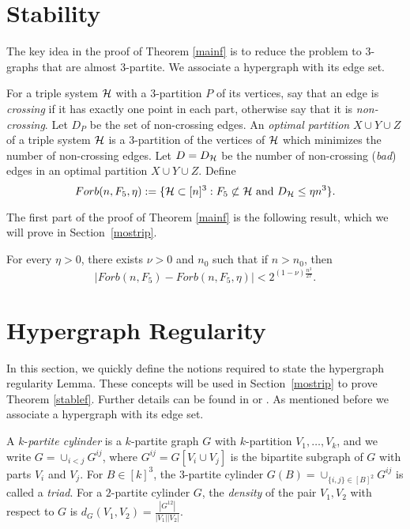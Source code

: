\documentclass[11pt]{article}
\begin{document}
\section{Stability}
The key idea in the proof of Theorem \ref{mainf} is to reduce the
problem to $3$-graphs that are almost $3$-partite. We  associate a hypergraph with its edge set.


 For a triple system $\mathcal{H}$
 with a $3$-partition $P$ of its vertices, say that an edge is {\em crossing} if it has exactly one point in each part,
 otherwise say that it is {\em non-crossing}.  Let $D_P$ be the set of non-crossing edges.
 An {\it
optimal partition} $X \cup Y \cup Z$ of a triple system $\mathcal{H}$ is a $3$-partition of the
vertices of $\mathcal{H}$ which minimizes the number of non-crossing edges.
Let $D=D_{\mathcal{H}}$ be the number of non-crossing ({\it bad}) edges in an
optimal partition $X \cup Y \cup Z$.  Define
$$Forb(n, F_5, \eta):=\{\mathcal{H} \subset [n]^3: F_5 \not\subset \mathcal{H}\hbox{ and } D_{\mathcal{H}}\le \eta n^3\}.$$

The first part of the proof of Theorem \ref{mainf} is the following
result, which we will prove in Section~\ref{mostrip}.

\begin{theorem} \label{stablef}
For every $\eta>0$, there exists $\nu>0$ and $n_0$ such that
 if $n>n_0$, then $$|Forb(n,F_5)-Forb(n, F_5, \eta)|<2^{(1-\nu)\frac{n^3}{27}}.$$
\end{theorem}


\section{Hypergraph Regularity}\label{hypreg}

In this section, we quickly define the notions required to state the
hypergraph regularity Lemma. These concepts will be used in
Section~\ref{mostrip} to prove Theorem \ref{stablef}. Further
details can be found in \cite{FR} or \cite{NR}.  As mentioned before
we associate a hypergraph with its edge set.

A $k$-{\it partite cylinder} is a $k$-partite graph $G$ with
$k$-partition $V_1, \ldots, V_k$, and we write $G=\cup_{i<j}
G^{ij}$, where $G^{ij}=G[V_i \cup V_j]$ is the bipartite subgraph
 of $G$ with parts $V_i$ and $V_j$.
 For $B \in [k]^3$, the $3$-partite cylinder $G(B)=\cup_{\{i,j\} \in [B]^2} G^{ij}$ is called a {\it triad}.
  For a $2$-partite cylinder $G$,
 the {\it density} of the pair $V_1, V_2$ with respect to $G$ is $d_G(V_1, V_2)=\frac{|G^{12}|}{|V_1||V_2|}$.
\end{document}
